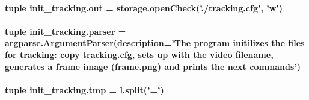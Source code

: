 \hypertarget{namespaceinit__tracking_a0f36ed6d4d6db2e74f3f852258832986}{
\paragraph[{out}]{\setlength{\rightskip}{0pt plus 5cm}tuple init\-\_\-tracking.\-out = {\bf storage.\-open\-Check}('./tracking.\-cfg', 'w')}}\label{namespaceinit__tracking_a0f36ed6d4d6db2e74f3f852258832986}
\hypertarget{namespaceinit__tracking_ac2534cae722aec75c084be09061968fa}{
\paragraph[{parser}]{\setlength{\rightskip}{0pt plus 5cm}tuple init\-\_\-tracking.\-parser = argparse.\-Argument\-Parser(description='The program initilizes the files for tracking\-: copy tracking.\-cfg, sets up with the video filename, generates a frame {\bf image} (frame.\-png) and prints the next commands')}}\label{namespaceinit__tracking_ac2534cae722aec75c084be09061968fa}
\hypertarget{namespaceinit__tracking_a02b68abd5880659ccbe3dde1479ada98}{
\paragraph[{tmp}]{\setlength{\rightskip}{0pt plus 5cm}tuple init\-\_\-tracking.\-tmp = {\bf l.\-split}('=')}}\label{namespaceinit__tracking_a02b68abd5880659ccbe3dde1479ada98}
